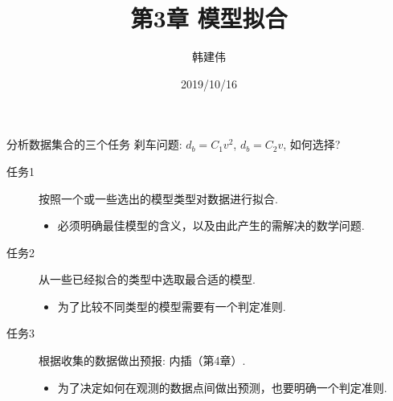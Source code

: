\documentclass[UTF8]{ctexbeamer}
\title{第3章 模型拟合}
\author{韩建伟}
\institute{
  信息学院\\
  \texttt{hanjianwei@zjgsu.edu.cn}
}
\date{2019/10/16}
\begin{document}
\begin{frame}[plain]
  \titlepage{}
\end{frame}

\begin{frame}{分析数据集合的三个任务}
  刹车问题: $d_b=C_1v^2$, $d_b=C_2v$, 如何选择?

  \begin{description}
  \item[任务1] 按照一个或一些选出的模型类型对数据进行拟合.
    \begin{itemize}
    \item 必须明确最佳模型的含义，以及由此产生的需解决的数学问题.
    \end{itemize}
  \item[任务2] 从一些已经拟合的类型中选取最合适的模型.
    \begin{itemize}
    \item 为了比较不同类型的模型需要有一个判定准则.
    \end{itemize}
  \item[任务3] 根据收集的数据做出预报: 内插（第4章）.
    \begin{itemize}
    \item 为了决定如何在观测的数据点间做出预测，也要明确一个判定准则.
    \end{itemize}
  \end{description}

\end{frame}
\end{document}
